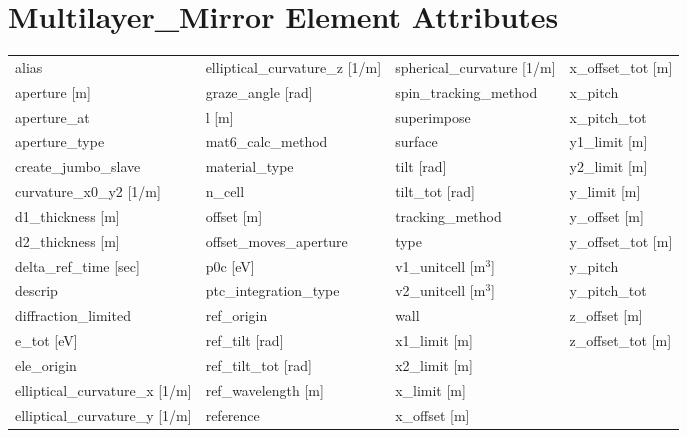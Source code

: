  \section{Multilayer_Mirror Element Attributes}
 \label{s:list.multilayer.mirror}

 \begin{tabular}{llll} \toprule
alias                          & elliptical_curvature_z [1/m]   & spherical_curvature [1/m]      & x_offset_tot [m]               \\
aperture [m]                   & graze_angle [rad]              & spin_tracking_method           & x_pitch                        \\
aperture_at                    & l [m]                          & superimpose                    & x_pitch_tot                    \\
aperture_type                  & mat6_calc_method               & surface                        & y1_limit [m]                   \\
create_jumbo_slave             & material_type                  & tilt [rad]                     & y2_limit [m]                   \\
curvature_x0_y2 [1/m]          & n_cell                         & tilt_tot [rad]                 & y_limit [m]                    \\
d1_thickness [m]               & offset [m]                     & tracking_method                & y_offset [m]                   \\
d2_thickness [m]               & offset_moves_aperture          & type                           & y_offset_tot [m]               \\
delta_ref_time [sec]           & p0c [eV]                       & v1_unitcell [m$^3$]            & y_pitch                        \\
descrip                        & ptc_integration_type           & v2_unitcell [m$^3$]            & y_pitch_tot                    \\
diffraction_limited            & ref_origin                     & wall                           & z_offset [m]                   \\
e_tot [eV]                     & ref_tilt [rad]                 & x1_limit [m]                   & z_offset_tot [m]               \\
ele_origin                     & ref_tilt_tot [rad]             & x2_limit [m]                   &                                \\
elliptical_curvature_x [1/m]   & ref_wavelength [m]             & x_limit [m]                    &                                \\
elliptical_curvature_y [1/m]   & reference                      & x_offset [m]                   &                                \\
 \bottomrule
 \end{tabular}
 \vfill

